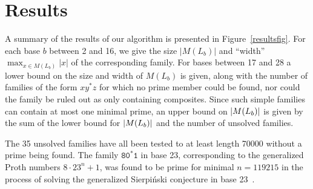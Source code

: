 \documentclass[12pt]{article}
\DeclarePairedDelimiter\abs{\lvert}{\rvert}
\theoremstyle{plain}
\theoremstyle{definition}
\theoremstyle{remark}
\newcommand{\0}{\mathtt{0}}
\newcommand{\1}{\mathtt{1}}
\newcommand{\2}{\mathtt{2}}
\newcommand{\3}{\mathtt{3}}
\newcommand{\4}{\mathtt{4}}
\newcommand{\5}{\mathtt{5}}
\newcommand{\6}{\mathtt{6}}
\newcommand{\7}{\mathtt{7}}
\newcommand{\8}{\mathtt{8}}
\newcommand{\9}{\mathtt{9}}
\begin{document}
\section{Results}
A summary of the results of our algorithm is presented in 
Figure~\ref{resultsfig}.
For each base $b$ between 2 and 16,
we give the size $|M(L_b)|$ and ``width'' $\max_{x \in M(L_b)} |x|$ of
the corresponding family.
For bases between 17 and 28 a lower bound on the size and width of
$M(L_b)$ is given, along with the number of families of the form
$xy^*z$ for which no prime member could be found, nor could the family be
ruled out as only containing composites.  Since such simple families can contain at
most one minimal prime, an upper bound on $\abs{M(L_b)}$ is given by the
sum of the lower bound for $\abs{M(L_b)}$ and the number of unsolved families.

The 35 unsolved families have all been tested to at least length 70000 without
a prime being found.  The family $\8\0^*\1$ in base 23, corresponding to the
generalized Proth numbers $8\cdot23^n+1$, was found to be prime
for minimal $n=119215$ in the process
of solving the generalized Sierpi\'nski conjecture in base 23~\cite{crus}.
\end{document}
